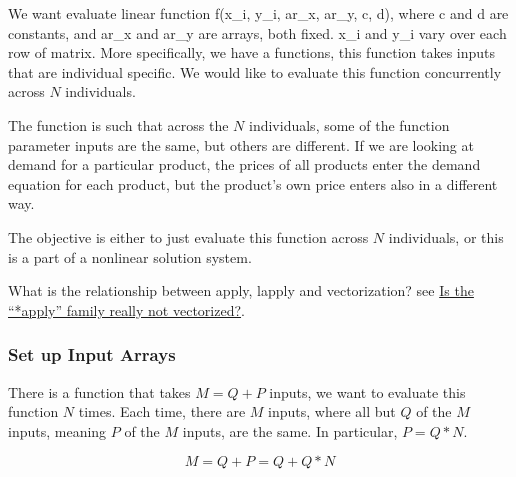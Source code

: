 \documentclass[
]{book}
\newenvironment{Shaded}{\begin{snugshade}}{\end{snugshade}}
\newcommand{\CommentTok}[1]{\textcolor[rgb]{0.56,0.35,0.01}{\textit{#1}}}
\newcommand{\DataTypeTok}[1]{\textcolor[rgb]{0.13,0.29,0.53}{#1}}
\newcommand{\DecValTok}[1]{\textcolor[rgb]{0.00,0.00,0.81}{#1}}
\newcommand{\FloatTok}[1]{\textcolor[rgb]{0.00,0.00,0.81}{#1}}
\newcommand{\KeywordTok}[1]{\textcolor[rgb]{0.13,0.29,0.53}{\textbf{#1}}}
\newcommand{\NormalTok}[1]{#1}
\newcommand{\OperatorTok}[1]{\textcolor[rgb]{0.81,0.36,0.00}{\textbf{#1}}}
\newcommand{\StringTok}[1]{\textcolor[rgb]{0.31,0.60,0.02}{#1}}
\begin{document}
We want evaluate linear function f(x\_i, y\_i, ar\_x, ar\_y, c, d), where c and d are constants, and ar\_x and ar\_y are arrays, both fixed. x\_i and y\_i vary over each row of matrix. More specifically, we have a functions, this function takes inputs that are individual specific. We would like to evaluate this function concurrently across \(N\) individuals.

The function is such that across the \(N\) individuals, some of the function parameter inputs are the same, but others are different. If we are looking at demand for a particular product, the prices of all products enter the demand equation for each product, but the product's own price enters also in a different way.

The objective is either to just evaluate this function across \(N\) individuals, or this is a part of a nonlinear solution system.

What is the relationship between apply, lapply and vectorization? see \href{https://stackoverflow.com/a/29006276/8280804}{Is the ``*apply'' family really not vectorized?}.

\hypertarget{set-up-input-arrays-2}{%
\subsubsection{Set up Input Arrays}\label{set-up-input-arrays-2}}

There is a function that takes \(M=Q+P\) inputs, we want to evaluate this function \(N\) times. Each time, there are \(M\) inputs, where all but \(Q\) of the \(M\) inputs, meaning \(P\) of the \(M\) inputs, are the same. In particular, \(P=Q*N\).

\[M = Q+P = Q + Q*N\]

\begin{Shaded}
\end{Shaded}
\end{document}
